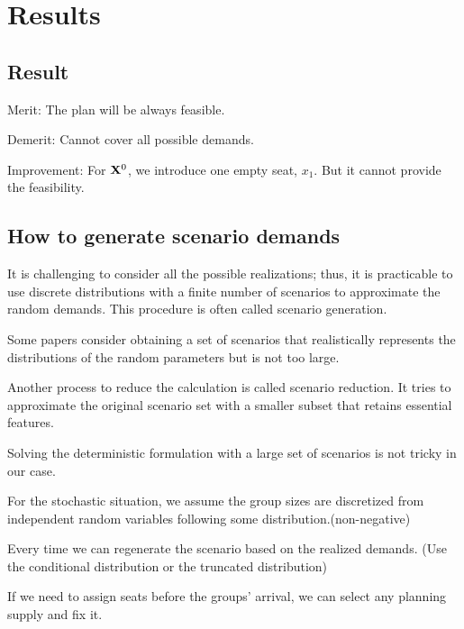 
\section{Results}

\subsection{Result}


Merit: The plan will be always feasible.

Demerit: Cannot cover all possible demands.

Improvement:
For $\mathbf{X}^{0}$, we introduce one empty seat, $x_1$. But it cannot provide the feasibility.

\subsection{How to generate scenario demands}
It is challenging to consider all the possible realizations; thus, it is practicable to use discrete distributions with a finite number of scenarios to approximate the random demands. This procedure is often called scenario generation.

Some papers consider obtaining a set of scenarios that realistically represents the distributions of the random parameters but is not too large. \cite{feng2013scenario} \cite{casey2005scenario}
\cite{henrion2018problem}

Another process to reduce the calculation is called scenario reduction. It tries to approximate the original scenario set with a smaller subset that retains essential features.

Solving the deterministic formulation with a large set of scenarios is not tricky in our case.

For the stochastic situation, we assume the group sizes are discretized from independent random variables following some distribution.(non-negative)

Every time we can regenerate the scenario based on the realized demands. (Use the conditional distribution or the truncated distribution)

If we need to assign seats before the groups' arrival, we can select any planning supply and fix it. 

